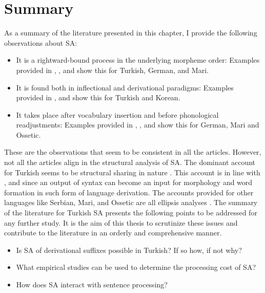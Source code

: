 \section{Summary}

As a summary of the literature presented in this chapter, I provide the following observations about SA:

\begin{itemize}
    \item It is a rightward-bound process in the underlying morpheme order: Examples provided in \citet{kabak2007turkish}, \citet{pounder2006broken}, and \citet{guseva2017postsyntactic} show this for Turkish, German, and Mari.
    
    \item It is found both in inflectional and derivational paradigms: Examples provided in \citet{akkucs2016suspended}, and \citet{yoon2017lexical} show this for Turkish and Korean.

    \item It takes place after vocabulary insertion and before phonological readjustments: Examples provided in  \citet{pounder2006broken}, \citet{guseva2017postsyntactic}, and \citet{erschler2018suspended} show this for German, Mari and Ossetic.
\end{itemize}

These are the observations that seem to be consistent in all the articles. However, not all the articles align in the structural analysis of SA. The dominant account for Turkish seems to be structural sharing in nature \citep{orgun1995flat,kornfilt1996some,broadwell2008turkish,kornfilt2012revisiting}. This account is in line with \citet{ackema2004beyond,kunduraci2016morphology}, and \citet{bruening2018word} since an output of syntax can become an input for morphology and word formation in such form of language derivation. The accounts provided for other languages like Serbian, Mari, and Ossetic are all ellipsis analyses \citep{despic2017suspended,guseva2017postsyntactic,erschler2018suspended}. The summary of the literature for Turkish SA presents the following points to be addressed for any further study. It is the aim of this thesis to scrutinize these issues and contribute to the literature in an orderly and comprehensive manner.

\begin{itemize}
    \item Is SA of derivational suffixes possible in Turkish? If so how, if not why?
    \item What empirical studies can be used to determine the processing cost of SA?
    \item How does SA interact with sentence processing?
\end{itemize}

